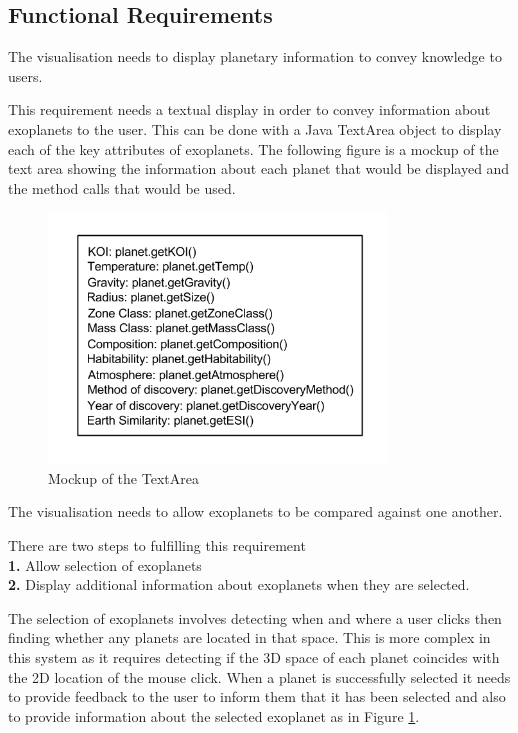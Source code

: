 \subsection{Functional Requirements}
\begin{enumerate}

{\bf
 \item[R1.] The visualisation needs to display planetary information to convey
knowledge to users.
}

  This requirement needs a textual display in order to convey information about exoplanets to the user. This can be done with a Java
TextArea object to display each of the key
attributes of exoplanets. The following figure is a mockup of the text area
showing the information about each planet that would be displayed and the method
calls that would be used.

\begin{figure}[H]
  \centering
      \includegraphics[width=0.8\textwidth]{images/textAreaMockup.png}
  \caption{Mockup of the TextArea}  
  \label{fig:text}
\end{figure}


\clearpage
{\bf
 \item[R2.] The visualisation needs to allow exoplanets to be compared against
one another.}

There are two steps to fulfilling this requirement\\ {\bf1.} Allow selection of
exoplanets \\ {\bf2.} Display additional information about exoplanets when they are
selected.

The selection of exoplanets involves detecting when and where a user clicks then 
finding whether any planets are
located in that space. This is more complex in this system as it requires
detecting if the 3D space of each planet coincides with the 2D
location of the mouse click. When a planet is successfully selected it needs to
provide feedback to the user to inform them that it has been selected and also to
provide information about the selected exoplanet as in Figure \ref{fig:text}.


\end{enumerate}

